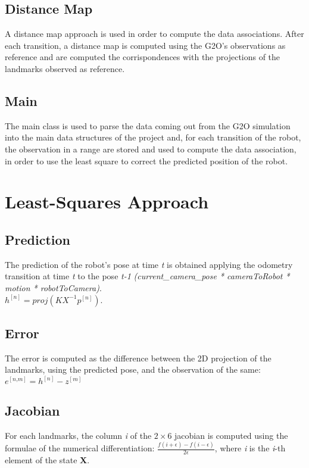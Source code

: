 \documentclass[10pt]{article}
\begin{document}
		\subsection{Distance Map}
		A distance map approach is used in order to compute the data associations.
		After each transition, a distance map is computed using the G2O's observations as reference and are computed the corrispondences with the projections of the landmarks observed as reference.

		\subsection{Main}
		The main class is used to parse the data coming out from the G2O simulation into the main data structures of the project and, for each transition of the robot, the observation in a range are stored and used to compute the data association, in order to use the least square to correct the predicted position of the robot.\\
		 		
	\section{Least-Squares Approach}
	\subsection{Prediction}
	The prediction of the robot's pose at time \textit{t} is obtained applying the odometry transition at time \textit{t} to the pose \textit{t-1} \textit{(current\_camera\_pose * cameraToRobot * motion * robotToCamera)}. \\
	$h^{[\textit{n}]} = proj(K X^{-1} p^{[\textit{n}]})$.
	
	\subsection{Error}
	The error is computed as the difference between the 2D projection of the landmarks, using the predicted pose, and the observation of the same:\\
	$e^{[\textit{n,m}]} = h^{[\textit{n}]} - z^{[\textit{m}]}$
	
	\subsection{Jacobian}
	For each landmarks, the column \textit{i} of the $2\times6$ jacobian is computed using the formulae of the numerical differentiation: $ \frac{f(i +  \epsilon) - f(i-\epsilon)}{2\epsilon}$,
	where \textit{i} is the \textit{i}-th element of the state \textbf{X}.
	
\end{document}
